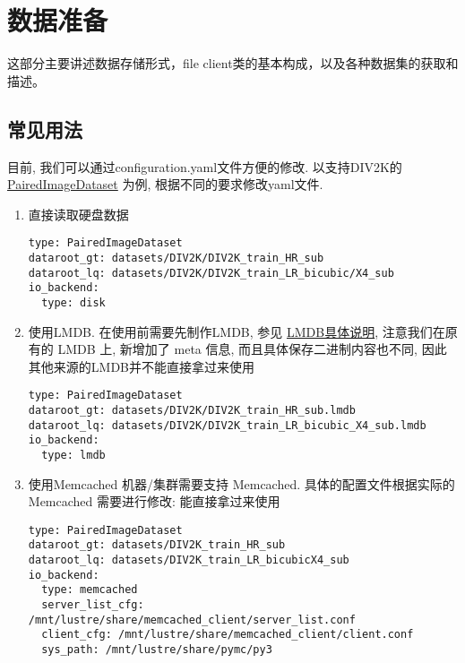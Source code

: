 \documentclass[../main.tex]{subfiles}
\begin{document}
\chapter{数据准备}
\vspace{-2cm}
这部分主要讲述数据存储形式，file client类的基本构成，以及各种数据集的获取和描述。


\section{常见用法}\label{data_preparation:common_use}

目前, 我们可以通过configuration.yaml文件方便的修改. 以支持DIV2K的 \href{https://github.com/XPixelGroup/BasicSR/blob/master/basicsr/data/paired_image_dataset.py}{PairedImageDataset} 为例, 根据不同的要求修改yaml文件.

\begin{enumerate}
\item 直接读取硬盘数据
\begin{verbatim}
type: PairedImageDataset
dataroot_gt: datasets/DIV2K/DIV2K_train_HR_sub
dataroot_lq: datasets/DIV2K/DIV2K_train_LR_bicubic/X4_sub
io_backend:
  type: disk
\end{verbatim}

\item 使用LMDB. 在使用前需要先制作LMDB, 参见 \href{https://github.com/XPixelGroup/BasicSR/blob/master/docs/DatasetPreparation_CN.md#LMDB%E5%85%B7%E4%BD%93%E8%AF%B4%E6%98%8E}{LMDB具体说明}, 注意我们在原有的 LMDB 上, 新增加了 meta 信息, 而且具体保存二进制内容也不同, 因此其他来源的LMDB并不能直接拿过来使用
\begin{verbatim}
type: PairedImageDataset
dataroot_gt: datasets/DIV2K/DIV2K_train_HR_sub.lmdb
dataroot_lq: datasets/DIV2K/DIV2K_train_LR_bicubic_X4_sub.lmdb
io_backend:
  type: lmdb
\end{verbatim}

\item 使用Memcached 机器/集群需要支持 Memcached. 具体的配置文件根据实际的 Memcached 需要进行修改:
能直接拿过来使用
\begin{verbatim}
type: PairedImageDataset
dataroot_gt: datasets/DIV2K_train_HR_sub
dataroot_lq: datasets/DIV2K_train_LR_bicubicX4_sub
io_backend:
  type: memcached
  server_list_cfg: /mnt/lustre/share/memcached_client/server_list.conf
  client_cfg: /mnt/lustre/share/memcached_client/client.conf
  sys_path: /mnt/lustre/share/pymc/py3
\end{verbatim}
\end{enumerate}
\end{document}
